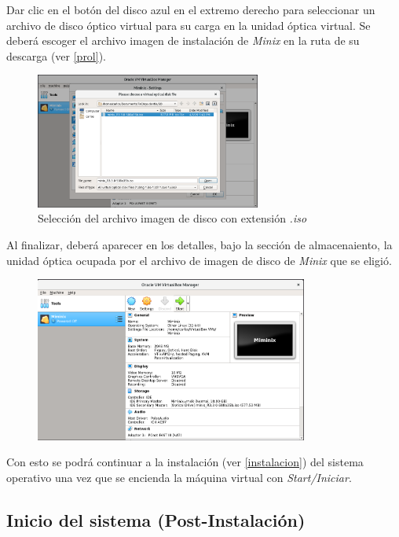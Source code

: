 \documentclass[12pt]{scrartcl}
\begin{document}
Dar clic en el botón del disco azul en el extremo derecho para seleccionar un archivo de disco óptico virtual para su carga en la unidad óptica virtual. Se deberá escoger el archivo imagen de instalación de \textit{Minix} en la ruta de su descarga (ver \ref{prol}).
\begin{figure}[H]
  \centering
  \includegraphics[width=0.66\textwidth]{vb/9.png}
  \caption{Selección del archivo imagen de disco con extensión \textit{.iso}}
\end{figure}

Al finalizar, deberá aparecer en los detalles, bajo la sección de almacenaiento, la unidad óptica ocupada por el archivo de imagen de disco de \textit{Minix} que se eligió.

\begin{figure}[H]
  \centering
  \includegraphics[width=0.8\textwidth]{vb/10.png}
  \caption{}
\end{figure}

Con esto se podrá continuar a la instalación (ver \ref{instalacion}) del sistema operativo una vez que se encienda la máquina virtual con \textit{Start/Iniciar}.

\subsection{Inicio del sistema (Post-Instalación)}\label{vb:post}
\end{document}
